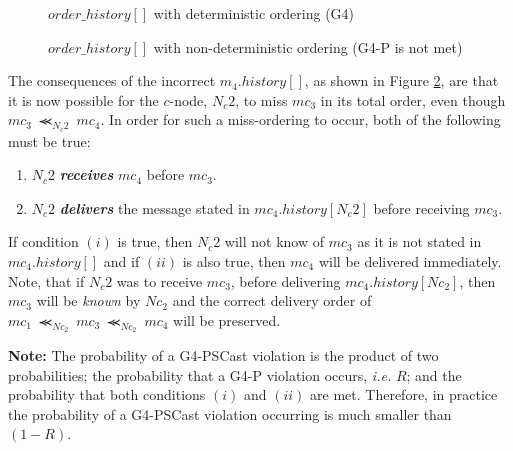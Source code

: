     \begin{figure}[h] 
        \centering
         \caption[Order History with deterministic ordering (G4)]{$order\_history[]$ with deterministic ordering (G4)}
         \label{fig:correct_ohistory_pscast}
    \end{figure}    

    \begin{figure}[h] 
        \centering
         \caption[Order History with non-deterministic ordering (G4-P is not met)]{$order\_history[]$ with non-deterministic ordering (G4-P is not met)}
         \label{fig:incorrect_ohistory_pscast}
    \end{figure}  
    
    The consequences of the incorrect $m_4.history[]$, as shown in Figure \ref{fig:incorrect_ohistory_pscast}, are that it is now possible for the $c$-node, $N_c2$, to miss $mc_3$ in its total order, even though ${mc_3 \ \llcurly_{N_c2} \ mc_4}$.  In order for such a miss-ordering to occur, both of the following must be true:
    
    \begin{enumerate}[label=\roman*]
        \item $N_c2$ \textbf{\emph{receives}} $mc_4$ before $mc_3$.     
        
        \item $N_c2$ \textbf{\emph{delivers}} the message stated in $mc_4.history[N_c2]$ before receiving $mc_3$.  
    \end{enumerate}
    
    If condition $(i)$ is true, then $N_c2$ will not know of $mc_3$ as it is not stated in $mc_4.history[]$ and if $(ii)$ is also true, then $mc_4$ will be delivered immediately.  Note, that if $N_c2$ was to receive $mc_3$, before delivering $mc_4.history[Nc_2]$, then $mc_3$ will be \emph{known} by $Nc_2$ and the correct delivery order of ${mc_1 \ \llcurly_{Nc_2} \ mc_3 \ \llcurly_{Nc_2} \ mc_4}$ will be preserved.  

    \textbf{Note:} The probability of a G4-PSCast violation is the product of two probabilities; the probability that a G4-P violation occurs, \emph{i.e.} $R$; and the probability that both conditions $(i)$ and $(ii)$ are met.  Therefore, in practice the probability of a G4-PSCast violation occurring is much smaller than $(1 - R)$.  

